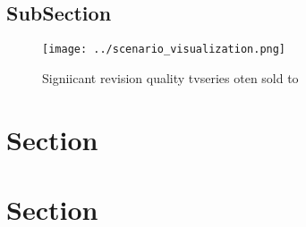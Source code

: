 \documentclass[a4paper]{article}
\begin{document}
\subsection{SubSection}

\begin{figure}
\centering
\texttt{[image: ../scenario\_visualization.png]}
\caption{Signiicant revision quality tvseries oten sold to
}
\end{figure}
 
\section{Section}

\section{Section}
\end{document}
